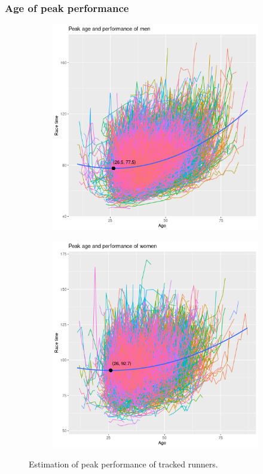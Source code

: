 \documentclass[12pt]{article}
\begin{document}
\subsubsection*{Age of peak performance}

\begin{figure}
	\centering
	\begin{subfigure}{0.49\textwidth}
		\includegraphics[width = \textwidth]
		{../figure/peak_plot2-1.png}
		\caption{}
		\label{peak-men}
	\end{subfigure}
	\hfill
	\begin{subfigure}{0.49\textwidth}
		\includegraphics[width = \textwidth]
		{../figure/peak_plot2-2.png}
		\caption{}
		\label{peak-women}
	\end{subfigure}
	\caption{
		Estimation of peak performance of tracked runners.
	}
	\label{peak}
\end{figure}
\end{document}
